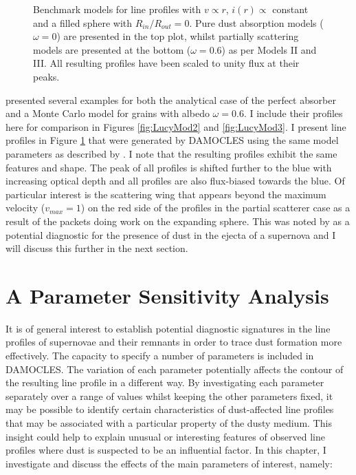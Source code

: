 \begin{figure}
\begin{subfigure}{\textwidth}
\end{subfigure}  
\caption{Benchmark models for line profiles  with $v \propto r$, $i(r) \propto$ constant and a filled sphere with $R_{in}/R_{out}=0$.  Pure dust absorption models ($\omega = 0$) are presented in the top plot, whilst partially scattering models are presented at the bottom ($\omega = 0.6$) as per \citet{Lucy1989} Models II and III. All resulting profiles have been scaled to unity flux at their peaks.}
\label{fig:Lucy}
\end{figure}


\citet{Lucy1989} presented several examples for both the analytical case of 
the perfect absorber and a Monte Carlo model for grains with albedo $\omega 
=0.6$.  I include their profiles here for comparison in Figures \ref{fig:LucyMod2} and \ref{fig:LucyMod3}.  I  present line profiles in Figure \ref{fig:Lucy} that were generated by DAMOCLES using the same model parameters as described by \citet{Lucy1989}.  I note that 
the resulting profiles exhibit the same features and shape. The peak of all profiles is shifted further to the blue with increasing optical depth and all profiles are also flux-biased towards the blue.  Of particular 
interest is the scattering wing that appears beyond the maximum velocity 
($v_{max}=1$) on the red side of the profiles in the partial 
scatterer case as a result of the packets doing work on the expanding sphere.  
This was noted by \citet{Lucy1989} as a potential diagnostic for the 
presence of dust in the ejecta of a supernova and I  will discuss this 
further in the next section.




\section{A Parameter Sensitivity Analysis}
It is of general interest to establish potential diagnostic signatures in 
the line profiles of supernovae and their remnants in order to trace dust 
formation more effectively. The capacity to specify a number of parameters is included in DAMOCLES.  The variation of each parameter potentially affects the contour of the resulting line profile in a different way.  By investigating each parameter separately over a range of values whilst keeping the other parameters fixed, it may be possible to identify certain characteristics of dust-affected line profiles that may be associated with a particular property of the dusty medium.  This insight could help to explain unusual or interesting features of observed line profiles where dust is suspected to be an influential factor.  In this chapter, I investigate and discuss the effects of the main 
parameters of interest, namely:

